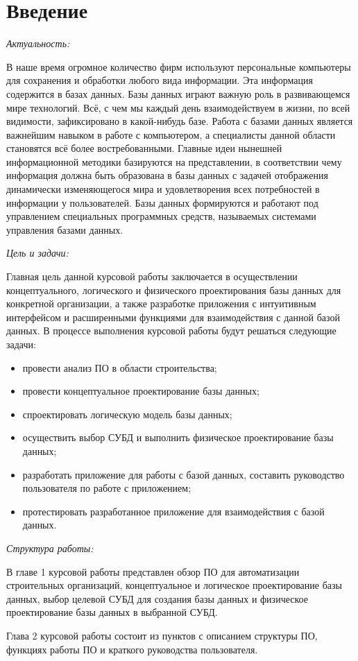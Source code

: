 \documentclass{../SIBGU-state}
\begin{document}
\tableofcontents



\section*{Введение}
{}

\textit{Актуальность:}\par
В наше время огромное количество фирм используют персональные компьютеры для сохранения и обработки любого вида информации. Эта информация содержится в базах данных. Базы данных играют важную роль в развивающемся мире технологий. Всё, с чем мы каждый день взаимодействуем в жизни, по всей видимости, зафиксировано в какой-нибудь базе. Работа с базами данных является важнейшим навыком в работе с компьютером, а специалисты данной области становятся всё более востребованными. Главные идеи нынешней информационной методики базируются на представлении, в соответствии чему информация должна быть образована в базы данных с задачей отображения динамически изменяющегося мира и удовлетворения всех потребностей в информации у пользователей. Базы данных формируются и работают под управлением специальных программных средств, называемых системами управления базами данных.\par\bigskip
\textit{Цель и задачи:}\par
 Главная цель данной курсовой работы заключается в осуществлении концептуального, логического и физического проектирования базы данных для конкретной организации, а также разработке приложения с интуитивным интерфейсом и расширенными функциями для взаимодействия с данной базой данных. В процессе выполнения курсовой работы будут решаться следующие задачи:
\begin{itemize}
	\item провести анализ ПО в области строительства;
	\item провести концептуальное проектирование базы данных;
    \item спроектировать логическую модель базы данных;
	\item осуществить выбор СУБД и выполнить физическое проектирование базы данных;
    \item разработать приложение для работы с базой данных, составить руководство пользователя по работе с приложением;
	\item протестировать разработанное приложение для взаимодействия с базой данных.
\end{itemize}\par\bigskip\bigskip
\textit{Структура работы:}\par
В главе 1 курсовой работы представлен обзор ПО для автоматизации строительных организаций, концептуальное и логическое проектирование базы данных, выбор целевой СУБД для создания базы данных и физическое проектирование базы данных в выбранной СУБД.\par
Глава 2 курсовой работы состоит из пунктов с описанием структуры ПО, функциях работы ПО и краткого руководства пользователя.\par\bigskip
\end{document}
